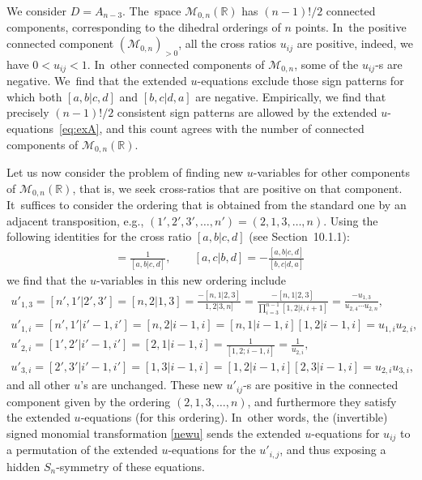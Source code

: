 \documentclass[pdftex]{sigma}%
\def\R{{\mathbb R}}
\def\M{{\mathcal{M}}}
\numberwithin{equation}{section}
\begin{document}
\medskip{} We consider $D = A_{n-3}$. The~space $\M_{0,n}(\R)$ has $(n{-}1)!/2$ connected components, corresponding to the dihedral orderings of $n$ points. In~the positive connected component $(\M_{0,n})_{> 0}$, all the cross ratios $u_{ij}$ are positive, indeed, we have $0 < u_{ij} < 1$. In~other connected components of $\M_{0,n}$, some of the $u_{ij}$-s are negative. We~find that the extended $u$-equations exclude those sign patterns for which both $[a, b | c, d]$ and $[b, c | d, a]$ are negative. Empirically, we find that precisely $(n{-}1)!/2$ consistent sign patterns are allowed by the extended $u$-equations~\eqref{eq:exA}, and this count agrees with the number of connected components of $\M_{0,n}(\R)$.

Let us now consider the problem of finding new $u$-variables for other components of $\M_{0,n}(\R)$, that is, we seek cross-ratios that are positive on that component. It~suffices to consider the orde\-ring that is obtained from the standard one by an adjacent transposition, e.g., $(1',2',3',\dots, n')=(2,1,3,\dots, n)$. Using the following identities for the cross ratio $[a, b | c, d]$ (see Section~10.1.1):
\begin{gather*}
[a, b| d, c]=\frac{1}{[a,b| c,d]},\qquad
[a, c| b,d]=-\frac{[a, b| c, d]}{[b,c | d,a]}\,
\end{gather*}
we find that the $u$-variables in this new ordering include
\begin{gather}
 u'_{1,3}=[n', 1'| 2', 3']=[n, 2 | 1, 3]=\frac{-[n, 1|2,3]}{1,2| 3, n]}=\frac{-[n,1|2,3]}{\prod_{i=3}^{n{-}1} [1,2 | i,i{+}1]}=\frac{-u_{1,3}}{u_{2,4} \cdots u_{2,n}}, \nonumber
 \\
 u'_{1, i}=[n', 1'| i'{-}1, i']=[n, 2| i-1, i]=[n,1| i{-}1,i][1,2| i{-}1,i]=u_{1,i}u_{2,i}, \nonumber
\\
 u'_{2, i}=[1', 2'| i'{-}1, i']=[2,1 | i{-}1, i]=\frac{1}{[1,2; i{-}1, i]}=\frac{1}{u_{2,i}}, \nonumber
\\
 u'_{3, i}=[2',3'| i'{-}1, i']=[1,3 |i{-}1, i]=[1,2 | i{-}1, i][2, 3 | i{-}1, i]=u_{2,i} u_{3,i},
\label{newu}
\end{gather}
and all other $u$'s are unchanged. These new $u'_{ij}$-s are positive in the connected component given by the ordering $(2,1,3,\dots, n)$, and furthermore they satisfy the extended $u$-equations (for this ordering). In~other words, the (invertible) signed monomial transformation \eqref{newu} sends the extended $u$-equations for $u_{ij}$ to a permutation of the extended $u$-equations for the $u'_{i,j}$, and thus exposing a hidden $S_n$-symmetry of these equations.
\end{document}
